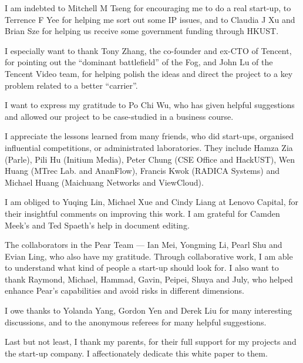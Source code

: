 I am indebted to Mitchell M Tseng for encouraging me to do a real start-up, to Terrence F Yee for helping me sort out some IP issues, and to Claudia J Xu and Brian Sze for helping us receive some government funding through HKUST. 

I especially want to thank Tony Zhang, the co-founder and ex-CTO of Tencent, for pointing out the ``dominant battlefield'' of the Fog, and John Lu of the Tencent Video team, for helping polish the ideas and direct the project to a key problem related to a better ``carrier''. 

I want to express my gratitude to Po Chi Wu, who has given helpful suggestions and allowed our project to be case-studied in a business course. 

I appreciate the lessons learned from many friends, who did start-ups, organised influential competitions, or administrated laboratories. They include Hamza Zia (Parle), Pili Hu (Initium Media), Peter Chung (CSE Office and HackUST), Wen Huang (MTrec Lab. and AnanFlow), Francis Kwok (RADICA Systems) and Michael Huang (Maichuang Networks and ViewCloud). 

I am obliged to Yuqing Lin, Michael Xue and Cindy Liang at Lenovo Capital, for their insightful comments on improving this work. I am grateful for Camden Meek's and Ted Spaeth's help in document editing.  

The collaborators in the Pear Team --- Ian Mei, Yongming Li, Pearl Shu and Evian Ling, who also have my gratitude. Through collaborative work, I am able to understand what kind of people a start-up should look for. I also want to thank Raymond, Michael, Hammad, Gavin, Peipei, Shuya and July, who helped enhance Pear's capabilities and avoid risks in different dimensions. 

I owe thanks to Yolanda Yang, Gordon Yen and Derek Liu for many interesting discussions, and to the anonymous referees for many helpful suggestions.

Last but not least, I thank my parents, for their full support for my projects and the start-up company. I affectionately dedicate this white paper to them. 

